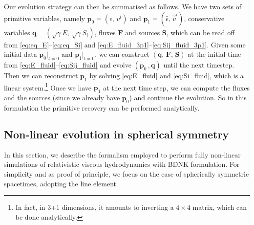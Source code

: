 \documentclass[prd,aps,twocolumn,floats,floatfix,nofootinbib,superscriptaddress] {revtex4-1}
\begin{document}
Our evolution strategy can then be summarised as follows. We have two sets of primitive variables, namely $\mathbf{p}_0=(\epsilon,\,v^i)$ and $\mathbf{p}_1=(\hat\epsilon,\,\hat{\bar v}^i)$,  conservative variables $\mathbf{q}=(\sqrt{\gamma}E,\,\sqrt{\gamma}S_i)$, fluxes $\mathbf{F}$ and sources $\mathbf{S}$, which can be read off from \eqref{eq:eq_E}--\eqref{eq:eq_Si} and \eqref{eq:E_fluid_3p1}--\eqref{eq:Sij_fluid_3p1}. Given some initial data $\mathbf{p}_0|_{t=0}$ and $\mathbf{p}_1|_{t=0}$, we can construct $(\mathbf{q},\,\mathbf{F},\,\mathbf{S})$ at the initial time from \eqref{eq:E_fluid}--\eqref{eq:Sij_fluid} and evolve $(\mathbf{p}_0\,,\mathbf{q})$ until the next timestep. Then we can reconstruct $\mathbf{p}_1$ by solving \eqref{eq:E_fluid} and \eqref{eq:Si_fluid}, which is a linear system.\footnote{In fact, in 3+1 dimensions, it amounts to inverting a $4\times 4$ matrix, which can be done analytically.} Once we have $\mathbf{p}_1$ at the next time step, we can compute the fluxes and the sources (since we already have $\mathbf{p}_0$) and continue the evolution. So in this formulation the primitive recovery can be performed analytically. 

\subsection{Non-linear evolution in spherical symmetry}

In this section, we describe the formalism employed to perform fully non-linear simulations of relativistic viscous hydrodynamics with BDNK formulation. For simplicity and as proof of principle, we focus on the case of spherically symmetric spacetimes, adopting the line element  
\end{document}
